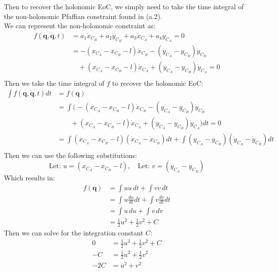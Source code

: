 \documentclass[titlepage]{article}
\begin{document}
\newpage

Then to recover the holonomic EoC, we simply need to take the time integral of the non-holonomic Pfaffian constraint found in (a.2).\\

We can represent the non-holonomic constraint as:
\begin{equation}
	\begin{split}
		f(\boldsymbol{q},\dot{\boldsymbol{q}},t)&=a_1\dot{x}_{C_B}+a_2\dot{y}_{C_B}+a_3\dot{x}_{C_A}+a_4\dot{y}_{C_A}=0 \\
		&=-(x_{C_A}-x_{C_B}-l)\dot{x}_{C_B}-(y_{C_A}-y_{C_B})\dot{y}_{C_B}\\
		&\quad+(x_{C_A}-x_{C_B}-l)\dot{x}_{C_A}+(y_{C_A}-y_{C_B})\dot{y}_{C_A}=0\\
	\end{split}
\end{equation}
Then we take the time integral of $f$ to recover the holonomic EoC:
\begin{equation}
	\begin{split}
		\int f(\boldsymbol{q},\dot{\boldsymbol{q}},t)dt&=f(\boldsymbol{q})\\
		&=\int\bigg(-(x_{C_A}-x_{C_B}-l)\dot{x}_{C_B}-(y_{C_A}-y_{C_B})\dot{y}_{C_B}\\
		&\qquad+(x_{C_A}-x_{C_B}-l)\dot{x}_{C_A}+(y_{C_A}-y_{C_B})\dot{y}_{C_A}\bigg)dt=0\\
		&=\int(x_{C_A}-x_{C_B}-l)(\dot{x}_{C_A}-\dot{x}_{C_B})dt+\int(y_{C_A}-y_{C_B})(\dot{y}_{C_A}-\dot{y}_{C_B})dt\\
	\end{split}
\end{equation}
Then we can use the following substitutions:
\begin{equation}
	\text{Let: }u=(x_{C_A}-x_{C_B}-l),\quad\text{Let: }v=(y_{C_A}-y_{C_B})
\end{equation}
Which results in:
\begin{equation}
	\begin{split}
		f(\boldsymbol{q})&=\int u\dot{u}\,dt+\int v\dot{v}\,dt \\
		&=\int u\frac{du}{dt}dt+\int v\frac{dv}{dt}dt \\
		&=\int u\,du+\int v\,dv \\
		&=\frac{1}{2}u^2+\frac{1}{2}v^2+C
	\end{split}
	\label{ea:a3holonomic}
\end{equation}
Then we can solve for the integration constant $C$:
\begin{equation}
	\begin{split}
		0&=\frac{1}{2}u^2+\frac{1}{2}v^2+C \\
		-C&=\frac{1}{2}u^2+\frac{1}{2}v^2 \\
		-2C&=u^2+v^2 \\
	\end{split}
	\label{eq:a3const}
\end{equation}
\end{document}

